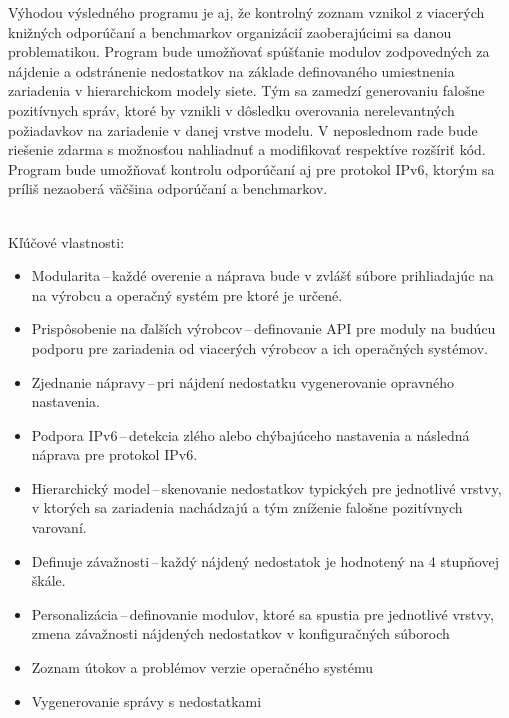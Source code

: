 Výhodou výsledného programu je aj, že kontrolný zoznam vznikol z viacerých knižných odporúčaní a benchmarkov organizácií zaoberajúcimi sa danou problematikou. Program bude umožňovať spúšťanie modulov zodpovedných za nájdenie a odstránenie nedostatkov na základe definovaného umiestnenia zariadenia v hierarchickom modely siete. Tým sa zamedzí generovaniu falošne pozitívnych správ, ktoré by vznikli v dôsledku overovania nerelevantných požiadavkov na zariadenie v danej vrstve modelu. V neposlednom rade bude riešenie zdarma s možnosťou nahliadnuť a modifikovať respektíve rozšíriť kód. Program bude umožňovať kontrolu odporúčaní aj pre protokol IPv6, ktorým sa príliš nezaoberá väčšina odporúčaní a benchmarkov.

\newpage
\noindent
\\
Kľúčové vlastnosti:

\begin{itemize}
	\item Modularita\,--\,každé overenie a náprava bude v zvlášť súbore prihliadajúc na na výrobcu a operačný systém pre ktoré je určené.
	\vspace{0.5em}
	\item Prispôsobenie na ďalších výrobcov\,--\,definovanie API pre moduly na budúcu podporu pre zariadenia od viacerých výrobcov a ich operačných systémov.
	\vspace{0.5em}
	\item Zjednanie nápravy\,--\,pri nájdení nedostatku vygenerovanie opravného nastavenia.
	\vspace{0.5em}
	\item Podpora IPv6\,--\,detekcia zlého alebo chýbajúceho nastavenia a následná náprava pre protokol IPv6.
	\vspace{0.5em}
	\item Hierarchický model\,--\,skenovanie nedostatkov typických pre jednotlivé vrstvy, v ktorých sa zariadenia nachádzajú a tým zníženie falošne pozitívnych varovaní.\vspace{0.5em}
	\item Definuje závažnosti\,--\,každý nájdený nedostatok je hodnotený na 4 stupňovej škále.
	\vspace{0.5em}
	\item Personalizácia\,--\,definovanie modulov, ktoré sa spustia pre jednotlivé vrstvy, zmena závažnosti nájdených nedostatkov v konfiguračných súboroch
	\vspace{0.5em}
	\item Zoznam útokov a problémov verzie operačného systému
	\vspace{0.5em}
	\item Vygenerovanie správy s nedostatkami
\end{itemize}

